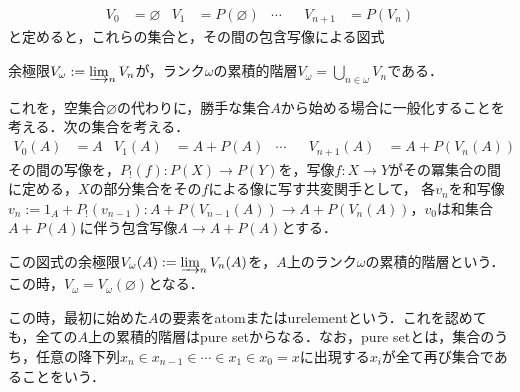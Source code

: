 \documentclass[uplatex, 12pt, dvipdfmx]{jsarticle}
\begin{document}
\begin{example}
    \begin{align*}
        V_0&=\varnothing & V_1&=P(\varnothing) &\cdots& & V_{n+1}&=P(V_n)
    \end{align*}
    と定めると，これらの集合と，その間の包含写像による図式
    \begin{center}
    \end{center}
    余極限$V_\omega:=\varinjlim_nV_n$が，ランク$\omega$の累積的階層$V_\omega=\bigcup_{n\in\omega}V_n$である．

    これを，空集合$\varnothing$の代わりに，勝手な集合$A$から始める場合に一般化することを考える．次の集合を考える．
    \begin{align*}
        V_0(A)&=A & V_1(A)&=A+P(A) &\cdots& & V_{n+1}(A)&=A+P(V_n(A))
    \end{align*}
    その間の写像を，$P_!(f):P(X)\to P(Y)$を，写像$f:X\to Y$がその冪集合の間に定める，$X$の部分集合をその$f$による像に写す共変関手として，
    各$v_n$を和写像$v_n:=1_A+P_!(v_{n-1}):A+P(V_{n-1}(A))\to A+P(V_n(A))$，$v_0$は和集合$A+P(A)$に伴う包含写像$A\to A+P(A)$とする．
    \begin{center}
    \end{center}
    この図式の余極限$V_\omega(A):=\varinjlim_nV_n(A)$を，$A$上のランク$\omega$の累積的階層という．この時，$V_\omega=V_\omega(\varnothing)$となる．

    この時，最初に始めた$A$の要素をatomまたはurelementという．これを認めても，全ての$A$上の累積的階層はpure setからなる．なお，pure setとは，集合のうち，任意の降下列$x_n\in x_{n-1}\in\cdots\in x_1\in x_0=x$に出現する$x_i$が全て再び集合であることをいう．


\end{example}
\end{document}
